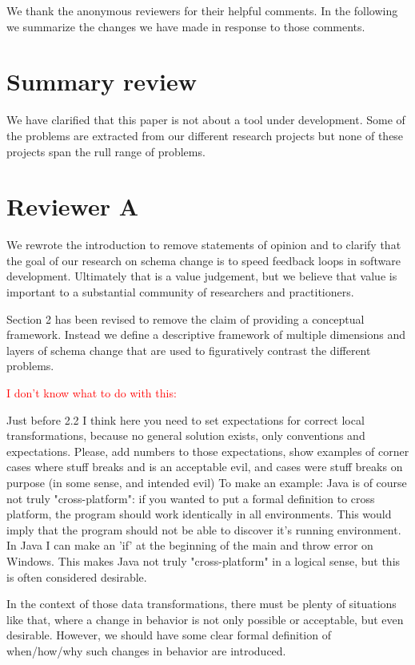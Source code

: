 \documentclass{article}
\begin{document}
We thank the anonymous reviewers for their helpful comments. In the following we summarize the changes we have made in response to those comments.

\section{Summary review}

We have clarified that this paper is not about a tool under development. Some of the problems are extracted from our different research projects but none of these projects span the rull range of problems.


\section{Reviewer A}

We rewrote the introduction to remove statements of opinion and to clarify that the goal of our research on schema change is to speed feedback loops in software development. Ultimately that is a value judgement, but we believe that value is important to a substantial community of researchers and practitioners.

Section 2 has been revised to remove the claim of providing a conceptual framework. Instead we define a descriptive framework of multiple dimensions and layers of schema change that are used to figuratively contrast the different problems.

\textcolor{red}{I don't know what to do with this:}
\begin{displayquote}
  Just before 2.2 I think here you need to set expectations for correct local transformations, because no general solution exists, only conventions and expectations. Please, add numbers to those expectations, show examples of corner cases where stuff breaks and is an acceptable evil, and cases were stuff breaks on purpose (in some sense, and intended evil) To make an example: Java is of course not truly "cross-platform": if you wanted to put a formal definition to cross platform, the program should work identically in all environments. This would imply that the program should not be able to discover it's running environment. In Java I can make an 'if' at the beginning of the main and throw error on Windows. This makes Java not truly "cross-platform" in a logical sense, but this is often considered desirable.

  In the context of those data transformations, there must be plenty of situations like that, where a change in behavior is not only possible or acceptable, but even desirable. However, we should have some clear formal definition of when/how/why such changes in behavior are introduced.
\end{displayquote}
\end{document}
